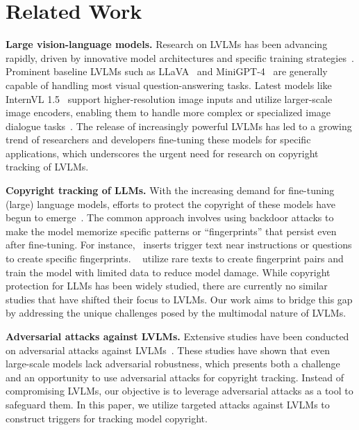 \section{Related Work}
\textbf{Large vision-language models.} Research on LVLMs has been advancing rapidly, driven by innovative model architectures and specific training strategies~\citep{yin2023, achiam2023gpt, liu2024improved, awadalla2023openflamingo, bai2023qwen, blip2}. Prominent baseline LVLMs such as LLaVA~\citep{llava} and MiniGPT-4~\citep{minigpt4} are generally capable of handling most visual question-answering tasks. Latest models like InternVL 1.5~\citep{chen2024far} support higher-resolution image inputs and utilize larger-scale image encoders, enabling them to handle more complex or specialized image dialogue tasks~\citep{liu2024llava, li2024mini}. The release of increasingly powerful LVLMs has led to a growing trend of researchers and developers fine-tuning these models for specific applications, which underscores the urgent need for research on copyright tracking of LVLMs.

\textbf{Copyright tracking of LLMs.} With the increasing demand for fine-tuning (large) language models, efforts to protect the copyright of these models have begun to emerge~\citep{kurita2020weight, gu2022watermarking, xu2023instructions, instructfinger}. The common approach involves using backdoor attacks to make the model memorize specific patterns or ``fingerprints'' that persist even after fine-tuning. For instance,~\citet{lishen} inserts trigger text near instructions or questions to create specific fingerprints. ~\citet{instructfinger} utilize rare texts to create fingerprint pairs and train the model with limited data to reduce model damage. While copyright protection for LLMs has been widely studied, there are currently no similar studies that have shifted their focus to LVLMs. Our work aims to bridge this gap by addressing the unique challenges posed by the multimodal nature of LVLMs.

\textbf{Adversarial attacks against LVLMs.} Extensive studies have been conducted on adversarial attacks against LVLMs~\citep{nips23zhao, shayegani2023jailbreak, cui2024robustness, non_iccv, xiangaaai2024, wang2024break}. These studies have shown that even large-scale models lack adversarial robustness, which presents both a challenge and an opportunity to use adversarial attacks for copyright tracking. Instead of compromising LVLMs, our objective is
to leverage adversarial attacks as a tool to safeguard them. In this paper, we utilize targeted attacks against LVLMs to construct triggers for tracking model copyright.


%